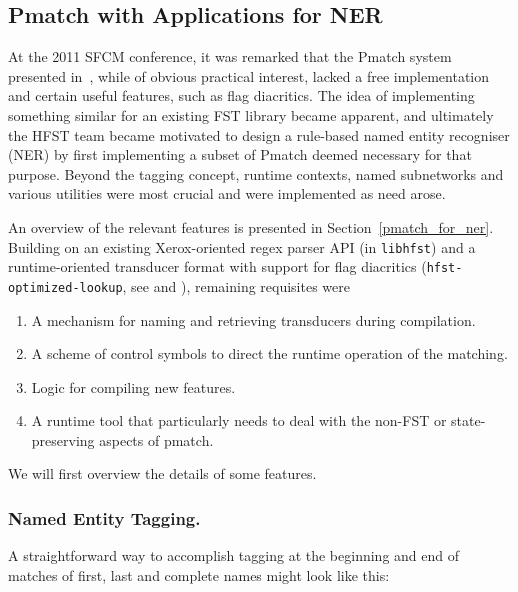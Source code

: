 \documentclass{llncs}
\begin{document}
\subsection{Pmatch with Applications for NER}
At the 2011 SFCM conference, it was remarked that the Pmatch system presented
in~\cite{karttunen/2011}, while
of obvious practical interest, lacked a free implementation and certain
useful features, such as flag diacritics. The idea of implementing
something similar for an existing FST library became apparent, and
ultimately the HFST team became motivated to design a rule-based named entity
recogniser (NER) by first implementing a subset of Pmatch deemed
necessary for that purpose. Beyond the tagging concept,
runtime contexts, named subnetworks and various utilities were most crucial and
were implemented as need arose.

An overview of the relevant features is presented in Section~\ref{pmatch_for_ner}.
Building on an existing Xerox-oriented regex parser API (in \verb+libhfst+) and a
runtime-oriented transducer format with support for flag diacritics
(\verb+hfst-optimized-lookup+, see \cite{silfverberg/2009} and
\cite{hfst/2011}), remaining requisites were

\begin{enumerate}
\item A mechanism for naming and retrieving transducers during compilation.
\item A scheme of control symbols to direct the runtime operation of the matching.
\item Logic for compiling new features.
\item A runtime tool that particularly needs to deal with the non-FST or
state-preserving aspects of pmatch.
\end{enumerate}

We will first overview the details of some features.

\subsubsection{Named Entity Tagging.}
A straightforward way to accomplish tagging at the beginning and end of matches
of first, last and complete names might look like this:
\end{document}
